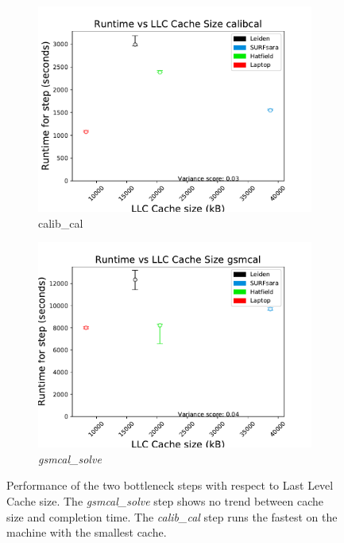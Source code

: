 \begin{figure}
    \centering
    \begin{subfigure}[b]{0.45\linewidth}
    \includegraphics[width=\linewidth]{ch4/figures/fig8/calibcal_LLC.pdf}
      \caption{calib\_cal }
	\label{fig:ch4_calib_cal_cache}
 \end{subfigure}%
 \begin{subfigure}[b]{0.45\linewidth}
    \includegraphics[width=\linewidth]{ch4/figures/fig8/gsmcal_LLC.pdf}
      \caption{\textit{gsmcal\_solve}}
	\label{fig:ch4_gsmcal_cache}
 \end{subfigure}
 \label{fig:ch4_cache_3_steps}
    \caption[Effect of cache size on the bottle neck steps for the four test machines.]{Performance of the two bottleneck steps with respect to Last Level Cache size. The \textit{gsmcal\_solve} step shows no trend between cache size and completion time. The \textit{calib\_cal} step runs the fastest on the machine with the smallest cache.  } 

\end{figure}

